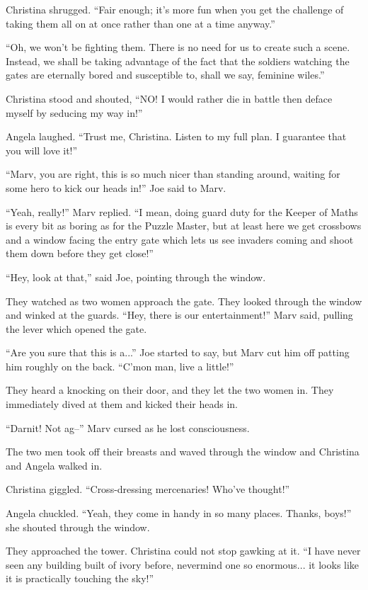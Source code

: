 \documentclass[showtrims,b6paper,draft,10pt]{memoir}
\begin{document}
Christina shrugged.  ``Fair enough;  it's more fun when you get the challenge of taking them all on at once rather than one at a time anyway.''

``Oh, we won't be fighting them.  There is no need for us to create such a scene.  Instead, we shall be taking advantage of the fact that the soldiers watching the gates are eternally bored and susceptible to, shall we say, feminine wiles.''

Christina stood and shouted,  ``NO!  I would rather die in battle then deface myself by seducing my way in!''

Angela laughed.  ``Trust me, Christina.  Listen to my full plan.  I guarantee that you will love it!''

\timeskip
``Marv, you are right, this is so much nicer than standing around, waiting for some hero to kick our heads in!''  Joe said to Marv.

``Yeah, really!''  Marv replied.  ``I mean, doing guard duty for the Keeper of Maths is every bit as boring as for the Puzzle Master, but at least here we get crossbows and a window facing the entry gate which lets us see invaders coming and shoot them down before they get close!''

``Hey, look at that,'' said Joe, pointing through the window.

They watched as two women approach the gate.  They looked through the window and winked at the guards.  ``Hey, there is our entertainment!''  Marv said, pulling the lever which opened the gate.

``Are you sure that this is a...''  Joe started to say, but Marv cut him off patting him roughly on the back.  ``C'mon man, live a little!''

They heard a knocking on their door, and they let the two women in.  They immediately dived at them and kicked their heads in.

``Darnit!  Not ag--''  Marv cursed as he lost consciousness.

The two men took off their breasts and waved through the window and Christina and Angela walked in.

Christina giggled.  ``Cross-dressing mercenaries!  Who've thought!''

Angela chuckled.  ``Yeah, they come in handy in so many places.  Thanks, boys!''  she shouted through the window.

They approached the tower.  Christina could not stop gawking at it.  ``I have never seen any building built of ivory before, nevermind one so enormous... it looks like it is practically touching the sky!''
\end{document}
